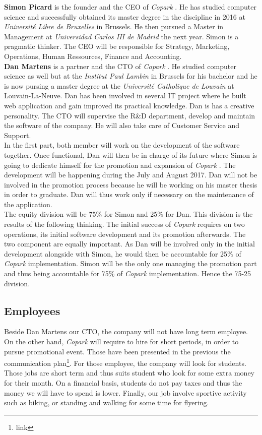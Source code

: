 \documentclass[12pt,a4paper,oneside]{book}
\newcommand{\bp}{\textit{Copark }}
\begin{document}
\textbf{Simon Picard} is the founder and the CEO of \bp. He has studied computer science and successfully obtained its master degree in the discipline in 2016 at \textit{Université Libre de Bruxelles} in Brussels. He then pursued a Master in Management at \textit{Universidad Carlos III de Madrid} the next year. Simon is a pragmatic thinker. The CEO will be responsible for Strategy, Marketing, Operations, Human Ressources, Finance and Accounting.\\

\textbf{Dan Martens} is a partner and the CTO of \bp. He studied computer science as well but at the \textit{Institut Paul Lambin} in Brussels for his bachelor and he is now pursing a master degree at the \textit{Université Catholique de Louvain} at Louvain-La-Neuve. Dan has been involved in several IT project where he built web application and gain improved its practical knowledge. Dan is has a creative personality. The CTO will supervise the R\&D department, develop and maintain the software of the company. He will also take care of Customer Service and Support.\\

In the first part, both member will work on the development of the software together. Once functional, Dan will then be in charge of its future where Simon is going to dedicate himself for the promotion and expansion of \bp. The development will be happening during the July and August 2017. Dan will not be involved in the promotion process because he will be working on his master thesis in order to graduate. Dan will thus work only if necessary on the maintenance of the application.\\

The equity division will be 75\% for Simon and 25\% for Dan. This division is the results of the following thinking. The initial success of \bp requires on two operations, its initial software development and its promotion afterwards. The two component are equally important. As Dan will be involved only in the initial development alongside with Simon, he would then be accountable for 25\% of \bp implementation. Simon will be the only one managing the promotion part and thus being accountable for 75\% of \bp implementation. Hence the 75-25 division.

\subsection{Employees}

Beside Dan Martens our CTO, the company will not have long term employee. On the other hand, \bp will require to hire for short periods, in order to pursue promotional event. Those have been presented in the previous the communication plan\footnote{link}. For those employee, the company will look for students. Those jobs are short term and thus suits student who look for some extra money for their month. On a financial basis, students do not pay taxes and thus the money we will have to spend is lower. Finally, our job involve sportive activity such as biking, or standing and walking for some time for flyering.
\end{document}
